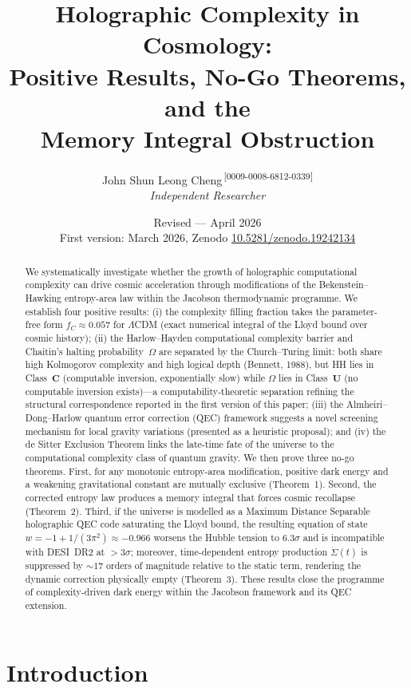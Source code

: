 \documentclass[12pt,a4paper]{article}
\title{Holographic Complexity in Cosmology:\\Positive Results, No-Go Theorems, and the\\Memory Integral Obstruction}
\author{John Shun Leong Cheng\,\textsuperscript{[0009-0008-6812-0339]}\\[4pt]
\textit{Independent Researcher}}
\date{Revised --- April 2026\\[4pt]
\small First version: March 2026, Zenodo \href{https://doi.org/10.5281/zenodo.19242134}{10.5281/zenodo.19242134}}
\theoremstyle{remark}
\begin{document}
\maketitle

\begin{abstract}
We systematically investigate whether the growth of holographic computational complexity can drive cosmic acceleration through modifications of the Bekenstein--Hawking entropy-area law within the Jacobson thermodynamic programme.
We establish four positive results:
(i) the complexity filling fraction takes the parameter-free form $f_C \approx 0.057$ for $\Lambda$CDM (exact numerical integral of the Lloyd bound over cosmic history);
(ii) the Harlow--Hayden computational complexity barrier and Chaitin's halting probability~$\Omega$ are separated by the Church--Turing limit: both share high Kolmogorov complexity and high logical depth (Bennett, 1988), but HH lies in Class~$\mathbf{C}$ (computable inversion, exponentially slow) while $\Omega$ lies in Class~$\mathbf{U}$ (no computable inversion exists)---a computability-theoretic separation refining the structural correspondence reported in the first version of this paper;
(iii) the Almheiri--Dong--Harlow quantum error correction (QEC) framework suggests a novel screening mechanism for local gravity variations (presented as a heuristic proposal);
and (iv) the de Sitter Exclusion Theorem links the late-time fate of the universe to the computational complexity class of quantum gravity.
We then prove three no-go theorems.
First, for any monotonic entropy-area modification, positive dark energy and a weakening gravitational constant are mutually exclusive (Theorem~1).
Second, the corrected entropy law produces a memory integral that forces cosmic recollapse (Theorem~2).
Third, if the universe is modelled as a Maximum Distance Separable holographic QEC code saturating the Lloyd bound, the resulting equation of state $w = -1 + 1/(3\pi^2) \approx -0.966$ worsens the Hubble tension to $6.3\sigma$ and is incompatible with DESI~DR2 at $>3\sigma$; moreover, time-dependent entropy production $\dot\Sigma(t)$ is suppressed by $\sim 17$ orders of magnitude relative to the static term, rendering the dynamic correction physically empty (Theorem~3).
These results close the programme of complexity-driven dark energy within the Jacobson framework and its QEC extension.
\end{abstract}

\section{Introduction}
\end{document}
